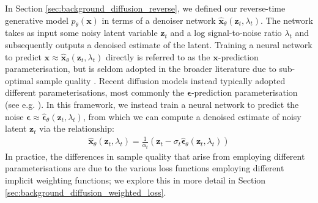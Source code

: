 \documentclass[ oneside,%
                    author={George Herbert},
                    degree={MSci},
                     title={Diffusion Models for Time-Evolving Precipitation Fields},
                  subtitle={}]{dissertation}
\begin{document}
In Section \ref{sec:background_diffusion_reverse}, we defined our reverse-time generative model $p_\theta(\mathbf{x})$ in terms of a denoiser network $\hat{\mathbf{x}}_\theta(\mathbf{z}_t,\lambda_t)$. The network takes as input some noisy latent variable $\mathbf{z}_t$ and a log signal-to-noise ratio $\lambda_t$ and subsequently outputs a denoised estimate of the latent. Training a neural network to predict $\mathbf{x}\approx\hat{\mathbf{x}}_\theta(\mathbf{z}_t, \lambda_t)$ directly is referred to as the $\mathbf{x}$-prediction parameterisation, but is seldom adopted in the broader literature due to sub-optimal sample quality \cite{DDPM_Ho}. Recent diffusion models instead typically adopted different parameterisations, most commonly the $\boldsymbol\epsilon$-prediction parameterisation (see e.g. \cite{DDPM_Ho,Cascaded_Ho,Imagen_Saharia}). In this framework, we instead train a neural network to predict the noise $\boldsymbol\epsilon\approx\hat{\boldsymbol\epsilon}_\theta(\mathbf{z}_t,\lambda_t)$, from which we can compute a denoised estimate of noisy latent $\mathbf{z}_t$ via the relationship:
\begin{align}
      \hat{\mathbf{x}}_\theta(\mathbf{z}_t,\lambda_t)=\frac{1}{\alpha_t}\left(\mathbf{z}_t-\sigma_t\hat{\boldsymbol\epsilon}_\theta(\mathbf{z}_t, \lambda_t)\right)
\end{align}
In practice, the differences in sample quality that arise from employing different parameterisations are due to the various loss functions employing different implicit weighting functions; we explore this in more detail in Section \ref{sec:background_diffusion_weighted_loss}.
\end{document}
